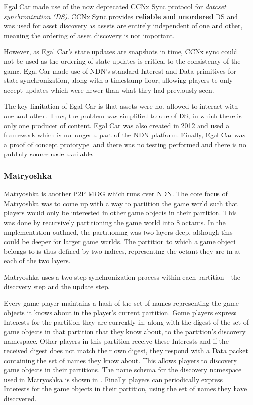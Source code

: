 Egal Car made use of the now deprecated CCNx Sync protocol \cite{ccnx-sync} for \textit{dataset synchronization (DS)}. CCNx Sync provides \textbf{reliable and unordered} DS and was used for asset discovery as assets are entirely independent of one and other, meaning the ordering of asset discovery is not important.

However, as Egal Car's state updates are snapshots in time, CCNx sync could not be used as the ordering of state updates is critical to the consistency of the game. Egal Car made use of NDN's standard Interest and Data primitives for state synchronization, along with a timestamp floor, allowing players to only accept updates which were newer than what they had previously seen.

The key limitation of Egal Car is that assets were not allowed to interact with one and other. Thus, the problem was simplified to one of DS, in which there is only one producer of content. Egal Car was also created in 2012 and used a framework which is no longer a part of the NDN platform. Finally, Egal Car was a proof of concept prototype, and there was no testing performed and there is no publicly source code available. 

\subsubsection*{Matryoshka \cite{ndn-multiplayer-game}}\label{sec:sota:matryoshka}
Matryoshka is another P2P MOG which runs over NDN. The core focus of Matryoshka was to come up with a way to partition the game world such that players would only be interested in other game objects in their partition. This was done by recursively partitioning the game world into 8 octants. In the implementation outlined, the partitioning was two layers deep, although this could be deeper for larger game worlds. The partition to which a game object belongs to is thus defined by two indices, representing the octant they are in at each of the two layers. 

Matryoshka uses a two step synchronization process within each partition - the discovery step and the update step. 

Every game player maintains a hash of the set of names representing the game objects it knows about in the player's current partition. Game players express Interests for the partition they are currently in, along with the digest of the set of game objects in that partition that they know about, to the partition's discovery namespace. Other players in this partition receive these Interests and if the received digest does not match their own digest, they respond with a Data packet containing the set of names they know about. This allows players to discovery game objects in their partitions. The name schema for the discovery namespace used in Matryoshka is shown in . Finally, players can periodically express Interests for the game objects in their partition, using the set of names they have discovered. 


